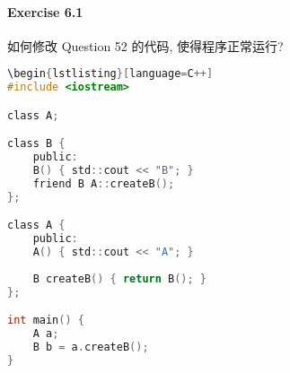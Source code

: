 \documentclass{article}
\begin{document}
	\paragraph*{Exercise 6.1} 
	
	如何修改 Question 52 的代码, 使得程序正常运行?
	
	\begin{lstlisting}[language=C]  		
	\begin{lstlisting}[language=C++]  		
#include <iostream>

class A;

class B {
	public:
	B() { std::cout << "B"; }
	friend B A::createB();
};

class A {
	public:
	A() { std::cout << "A"; }
	
	B createB() { return B(); }
};

int main() {
	A a;
	B b = a.createB();
}
	\end{lstlisting}
	
	
	
\end{document}
